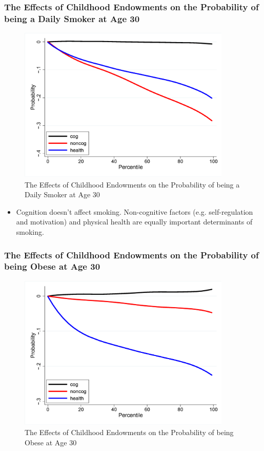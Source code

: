 \subsubsection{The Effects of Childhood Endowments on the Probability of being a Daily Smoker at Age 30}    
\begin{figure}[H]%
                \centering
                \includegraphics[width=4in]{images/ch3/45.png}
                \caption {The Effects of Childhood Endowments on the Probability of
being a Daily Smoker at Age 30}
            \end{figure} 

\begin{itemize}
    \item Cognition doesn't affect smoking. Non-cognitive factors (e.g. self-regulation and motivation) and physical health are equally important determinants of smoking.
\end{itemize}

\subsubsection{The Effects of Childhood Endowments on the Probability of being Obese at Age 30}    
\begin{figure}[H]%
                \centering
                \includegraphics[width=4in]{images/ch3/46.png}
                \caption {The Effects of Childhood Endowments on the Probability of
being Obese at Age 30}
            \end{figure} 
            
